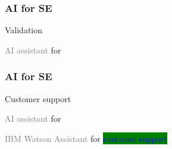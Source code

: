 \newpage
\begin{frame}
\frametitle{ AI for SE }
\begin{block}{ Validation  }

  \vspace{1cm} 
  
 \colorbox{gray!35}{ \textcolor{gray}{   AI assistant  } }   for
   \colorbox{blue!47}{ \textcolor{white}{ Testing } } 

\end{block}
\end{frame}


\newpage
\begin{frame}
\frametitle{ AI for SE }
\begin{block}{ Customer support  }

  \vspace{1cm} 
  
 \colorbox{gray!35}{ \textcolor{gray}{   AI assistant  } }   for
   \colorbox{blue!47}{ \textcolor{white}{ customer support } } 

  \vspace{1cm} 

 \colorbox{gray!35}{ \textcolor{gray}{  IBM Watson  Assistant } }   for
   \colorbox{green}{ \textcolor{blue}{ customer support } }
   
\end{block}
\end{frame}


\newpage